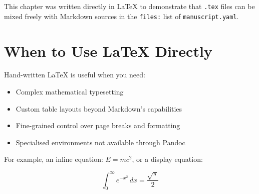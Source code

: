 This chapter was written directly in \LaTeX{} to demonstrate that
\texttt{.tex} files can be mixed freely with Markdown sources in the
\texttt{files:} list of \texttt{manuscript.yaml}.

\section*{When to Use \LaTeX{} Directly}

Hand-written \LaTeX{} is useful when you need:

\begin{itemize}
  \item Complex mathematical typesetting
  \item Custom table layouts beyond Markdown's capabilities
  \item Fine-grained control over page breaks and formatting
  \item Specialised environments not available through Pandoc
\end{itemize}

\noindent For example, an inline equation: $E = mc^2$, or a display equation:

\begin{equation}
  \int_0^\infty e^{-x^2}\, dx = \frac{\sqrt{\pi}}{2}
\end{equation}
